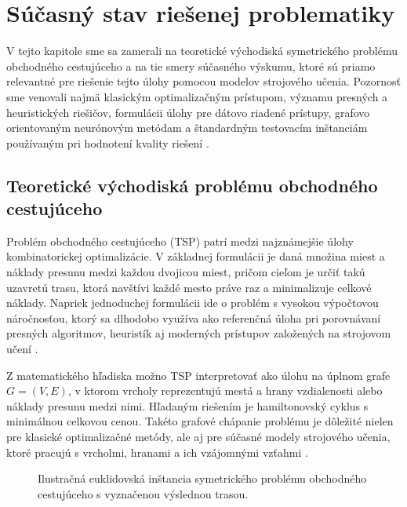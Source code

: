 \chapter{Súčasný stav riešenej problematiky}

V tejto kapitole sme sa zamerali na teoretické východiská symetrického problému
obchodného cestujúceho a na tie smery súčasného výskumu, ktoré sú priamo
relevantné pre riešenie tejto úlohy pomocou modelov strojového učenia.
Pozornosť sme venovali najmä klasickým optimalizačným prístupom, významu
presných a heuristických riešičov, formulácii úlohy pre dátovo riadené
prístupy, grafovo orientovaným neurónovým metódam a štandardným testovacím
inštanciám používaným pri hodnotení kvality riešení
\parencite{matai2010overview,bengio2021mlco,cappart2023gnnco}.

\section{Teoretické východiská problému obchodného cestujúceho}

Problém obchodného cestujúceho (TSP)
patrí medzi najznámejšie úlohy kombinatorickej optimalizácie. V základnej
formulácii je daná množina miest a náklady presunu medzi každou dvojicou miest,
pričom cieľom je určiť takú uzavretú trasu, ktorá navštívi každé mesto práve raz
a minimalizuje celkové náklady. Napriek jednoduchej formulácii ide o problém
s vysokou výpočtovou náročnosťou, ktorý sa dlhodobo využíva ako referenčná úloha
pri porovnávaní presných algoritmov, heuristík aj moderných prístupov
založených na strojovom učení
\parencite{matai2010overview,bengio2021mlco}.

Z matematického hľadiska možno TSP interpretovať ako úlohu na úplnom grafe
$G=(V,E)$, v ktorom vrcholy reprezentujú mestá a hrany vzdialenosti alebo
náklady presunu medzi nimi. Hľadaným riešením je hamiltonovský cyklus
s minimálnou celkovou cenou. Takéto grafové chápanie problému je dôležité nielen
pre klasické optimalizačné metódy, ale aj pre súčasné modely strojového učenia,
ktoré pracujú s vrcholmi, hranami a ich vzájomnými vzťahmi
\parencite{matai2010overview,cappart2023gnnco}.

\begin{figure}[H]
    \centering
    
    \caption{Ilustračná euklidovská inštancia symetrického problému obchodného
             cestujúceho s vyznačenou výslednou trasou.}
    \label{fig:tsp_instance}
\end{figure}

